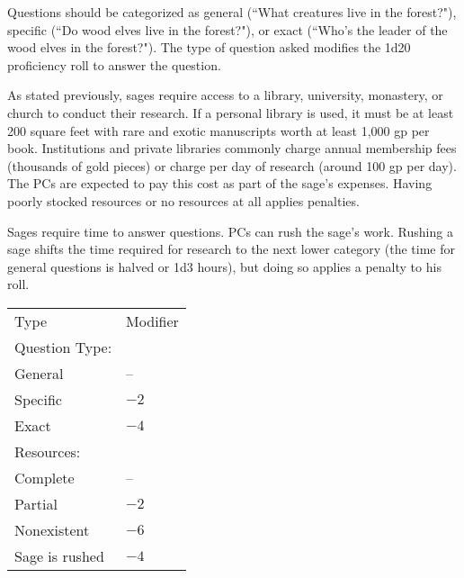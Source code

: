 \begin{multicols}{2}
Questions should be categorized as general (``What creatures live in the forest?"), specific (``Do wood elves live in the forest?"), or exact (``Who's the leader of the wood elves in the forest?").  The type of question asked modifies the 1d20 proficiency roll to answer the question.

As stated previously, sages require access to a library, university, monastery, or church to conduct their research.  If a personal library is used, it must be at least 200 square feet with rare and exotic manuscripts worth at least 1,000 gp per book.  Institutions and private libraries commonly charge annual membership fees (thousands of gold pieces) or charge per day of research (around 100 gp per day).  The PCs are expected to pay this cost as part of the sage's expenses.  Having poorly stocked resources or no resources at all applies penalties.

Sages require time to answer questions.  PCs can rush the sage's work.  Rushing a sage shifts the time required for research to the next lower category (the time for general questions is halved or 1d3 hours), but doing so applies a penalty to his roll.

\noindent
\begin{minipage}{\columnwidth}

\label{sageproficiencymods}
\noindent
\begin{tabular}{|p{}|p{}|}
\hline
Type	& Modifier \\
\rowcolor[gray]{.9}Question Type:	& \\
\rowcolor[gray]{.9}\hspace{2em}General	& -- \\
\hspace{2em}Specific	& $-2$ \\
\rowcolor[gray]{.9}\hspace{2em}Exact	& $-4$ \\
Resources:	& \\
\hspace{2em}Complete	& -- \\
\rowcolor[gray]{.9}\hspace{2em}Partial	& $-2$ \\
\hspace{2em}Nonexistent	& $-6$ \\
\rowcolor[gray]{.9}Sage is rushed	& $-4$ \\
\hline
\end{tabular}


\end{minipage}
\end{multicols}
